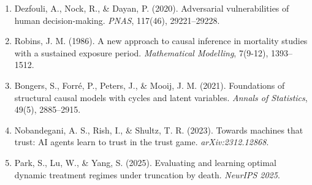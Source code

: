 \documentclass[
]{article}
\begin{document}
\begin{enumerate}
\def\labelenumi{\arabic{enumi}.}
\item
  Dezfouli, A., Nock, R., \& Dayan, P. (2020). Adversarial
  vulnerabilities of human decision-making. \emph{PNAS}, 117(46),
  29221--29228.
\item
  Robins, J. M. (1986). A new approach to causal inference in mortality
  studies with a sustained exposure period. \emph{Mathematical
  Modelling}, 7(9-12), 1393--1512.
\item
  Bongers, S., Forré, P., Peters, J., \& Mooij, J. M. (2021).
  Foundations of structural causal models with cycles and latent
  variables. \emph{Annals of Statistics}, 49(5), 2885--2915.
\item
  Nobandegani, A. S., Rish, I., \& Shultz, T. R. (2023). Towards
  machines that trust: AI agents learn to trust in the trust game.
  \emph{arXiv:2312.12868}.
\item
  Park, S., Lu, W., \& Yang, S. (2025). Evaluating and learning optimal
  dynamic treatment regimes under truncation by death. \emph{NeurIPS
  2025}.
\end{enumerate}
\end{document}
